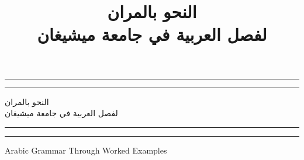 \documentclass[11pt,twoside]{book}
\title{النحو بالمران\\لفصل العربية في جامعة ميشيغان}
\begin{document}
\frontmatter


\begin{titlepage} %

	\centering %
	
	\scshape %
	
	\vspace*{\baselineskip} %
	
	
	\rule{\textwidth}{1.6pt}\vspace*{-\baselineskip}\vspace*{2pt} %
	\rule{\textwidth}{0.4pt} %
	
	\vspace{0.75\baselineskip} %
	
	{\LARGE النحو بالمران\\لفصل العربية في جامعة ميشيغان\\} %
	
	\vspace{0.75\baselineskip} %
	
	\rule{\textwidth}{0.4pt}\vspace*{-\baselineskip}\vspace{3.2pt} %
	\rule{\textwidth}{1.6pt} %
	
	\vspace{2\baselineskip} %
	
	
	\textenglish{Arabic Grammar Through Worked Examples} %
	
	\vspace*{3\baselineskip} %
	
	
	
	\vspace{0.5\baselineskip} %
	
	

\end{titlepage}
\end{document}
